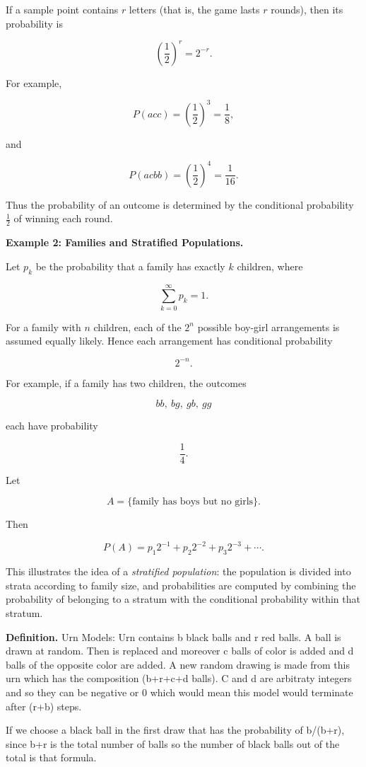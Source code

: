 \documentclass[12pt]{article}
\begin{document}
If a sample point contains $r$ letters (that is, the game lasts $r$ rounds),
then its probability is

\[
\left(\frac12\right)^r = 2^{-r}.
\]

For example,

\[
P(acc)=\left(\frac12\right)^3=\frac18,
\]

and

\[
P(acbb)=\left(\frac12\right)^4=\frac1{16}.
\]

Thus the probability of an outcome is determined by the conditional
probability $\frac12$ of winning each round.

\textbf{Example 2: Families and Stratified Populations.}

Let $p_k$ be the probability that a family has exactly $k$ children, where

\[
\sum_{k=0}^{\infty} p_k = 1.
\]

For a family with $n$ children, each of the $2^n$ possible boy-girl
arrangements is assumed equally likely. Hence each arrangement has
conditional probability

\[
2^{-n}.
\]

For example, if a family has two children, the outcomes

\[
bb,\ bg,\ gb,\ gg
\]

each have probability

\[
\frac14.
\]

Let

\[
A=\{\text{family has boys but no girls}\}.
\]

Then

\[
P(A)
=
p_1 2^{-1}
+
p_2 2^{-2}
+
p_3 2^{-3}
+\cdots.
\]

This illustrates the idea of a \emph{stratified population}: the population
is divided into strata according to family size, and probabilities are
computed by combining the probability of belonging to a stratum with the
conditional probability within that stratum.

\textbf{Definition.}
Urn Models: Urn contains b black balls and r red balls. A ball is drawn at random. Then is replaced and moreover c balls of color is added and d balls of the opposite color are added. A new random drawing is made from this urn which has the composition (b+r+c+d balls). 
C and d are arbitraty integers and so they can be negative or 0 which would mean this model would terminate after (r+b) steps.

If we choose a black ball in the first draw that has the probability of b/(b+r), since b+r is the total number of balls so the number of black balls out of the total is that formula.
\end{document}

